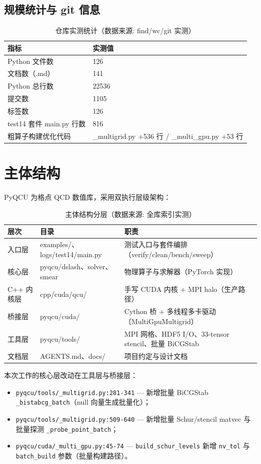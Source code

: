 \documentclass[UTF8]{ctexart}
\begin{document}
\subsection{规模统计与 git 信息}
\begin{table}[htbp]\centering
\begin{tabular}{ll}
\toprule
指标 & 实测值 \\
\midrule
Python 文件数 & 126 \\
文档数（.md） & 141 \\
Python 总行数 & 22536 \\
提交数 & 1105 \\
标签数 & 126 \\
test14 套件 main.py 行数 & 816 \\
粗算子构建优化代码 & \_multigrid.py +536 行 / \_multi\_gpu.py +53 行 \\
\bottomrule
\end{tabular}
\caption{仓库实测统计（数据来源: find/wc/git 实测）}
\end{table}

\section{主体结构}
PyQCU 为格点 QCD 数值库，采用\textcolor{struct}{双执行层级}架构：
\begin{table}[htbp]\centering
\begin{tabularx}{\textwidth}{llX}
\toprule
\textcolor{struct}{层次} & 目录 & \textcolor{struct}{职责} \\
\midrule
入口层 & examples/、logs/test14/main.py & 测试入口与套件编排（verify/clean/bench/sweep） \\
核心层 & pyqcu/dslash、solver、smear & 物理算子与求解器（PyTorch 实现） \\
C++ 内核层 & cpp/cuda/qcu/ & 手写 CUDA 内核 + MPI halo（生产路径） \\
桥接层 & pyqcu/cuda/ & Cython 桥 + 多线程多卡驱动（MultiGpuMultigrid） \\
工具层 & pyqcu/tools/ & MPI 网格、HDF5 I/O、33-tensor stencil、批量 BiCGStab \\
文档层 & AGENTS.md、docs/ & 项目约定与设计文档 \\
\bottomrule
\end{tabularx}
\caption{主体结构分层（数据来源: 全库索引实测）}
\end{table}

\textcolor{struct}{本次工作的核心层改动}在工具层与桥接层：
\begin{itemize}
\item \texttt{pyqcu/tools/\_multigrid.py:281-341} --- 新增批量 BiCGStab
  \texttt{\_bistabcg\_batch}（null 向量生成批量化）；
\item \texttt{pyqcu/tools/\_multigrid.py:509-640} --- 新增批量 Schur/stencil matvec
  与批量探测 \texttt{\_probe\_point\_batch}；
\item \texttt{pyqcu/cuda/\_multi\_gpu.py:45-74} --- \texttt{build\_schur\_levels}
  新增 \texttt{nv\_tol} 与 \texttt{batch\_build} 参数（批量构建路径）。
\end{itemize}
\end{document}
